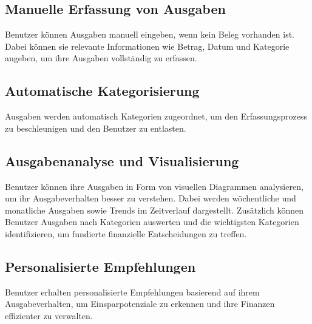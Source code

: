 \documentclass[12pt,a4paper]{article}
\begin{document}
\subsection{Manuelle Erfassung von Ausgaben}

Benutzer können Ausgaben manuell eingeben, wenn kein Beleg vorhanden ist. Dabei 
können sie relevante Informationen wie Betrag, Datum und Kategorie angeben, um 
ihre Ausgaben vollständig zu erfassen.

\subsection{Automatische Kategorisierung}

Ausgaben werden automatisch Kategorien zugeordnet, um den Erfassungsprozess zu 
beschleunigen und den Benutzer zu entlasten.

\subsection{Ausgabenanalyse und Visualisierung}

Benutzer können ihre Ausgaben in Form von visuellen Diagrammen analysieren, 
um ihr Ausgabeverhalten besser zu verstehen. Dabei werden wöchentliche und 
monatliche Ausgaben sowie Trends im Zeitverlauf dargestellt. Zusätzlich können 
Benutzer Ausgaben nach Kategorien auswerten und die wichtigsten Kategorien identifizieren, 
um fundierte finanzielle Entscheidungen zu treffen.

\subsection{Personalisierte Empfehlungen}

Benutzer erhalten personalisierte Empfehlungen basierend auf ihrem Ausgabeverhalten, um Einsparpotenziale zu erkennen und ihre Finanzen effizienter zu verwalten.
\end{document}
